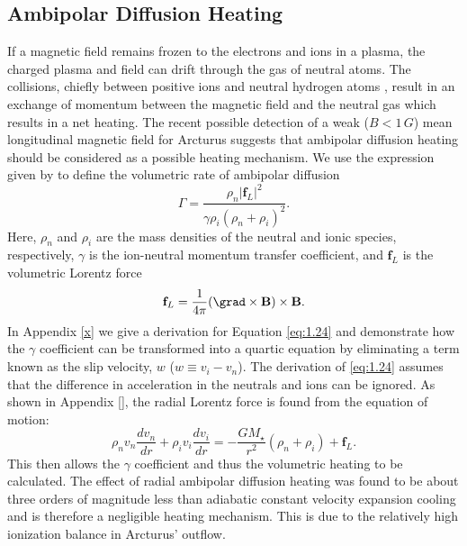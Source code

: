 \subsection{Ambipolar Diffusion Heating}\label{sec:7.4.2}
If a magnetic field remains frozen to the electrons and ions in a plasma, the charged plasma and field can drift through the gas of neutral atoms. The collisions, chiefly between positive ions and neutral hydrogen atoms \citep{spitzer_1978}, result in an exchange of momentum between the magnetic field and the neutral gas which results in a net heating. The recent possible detection of a weak ($B < 1\,G$) mean longitudinal magnetic field for Arcturus \citep{Sennhauser_2011} suggests that ambipolar diffusion heating should be considered as a possible heating mechanism.  We use the expression given by \cite{shang_2002} to define the volumetric rate of ambipolar  diffusion 
\begin{equation}\label{eq:1.24}
\Gamma = \frac{\rho _{n}|\mathbf{f}_{L}|^2}{\gamma \rho _{i}(\rho _{n}+\rho _{i})^2}.
\end{equation}
Here, $\rho _{n}$ and $\rho _{i}$ are the mass densities of the neutral and ionic species, respectively, $\gamma$ is the ion-neutral momentum transfer coefficient, and $\textbf{f}_{L}$ is the volumetric Lorentz force
\begin{equation}
\textbf{f}_{L}=\frac{1}{4\pi}(\grad \times \textbf{B})\times \textbf{B}.
\end{equation}
In Appendix \ref{x} we give a derivation for Equation \ref{eq:1.24} and demonstrate how the $\gamma$ coefficient can be transformed into a quartic equation by eliminating a term known as the slip velocity, $w$ ($w\equiv v_{i}-v_{n}$). The derivation of \ref{eq:1.24} assumes that the difference in acceleration in the neutrals and ions can be ignored. As shown in Appendix \ref{}, the radial Lorentz force is found from the equation of motion:
\begin{equation}
\rho _{n}v_{n}\frac{dv_{n}}{dr}+\rho _{i}v_{i}\frac{dv_{i}}{dr}=-\frac{GM_{\star}}{r^2}(\rho _{n} + \rho _{i})+\mathbf{f}_{L}.
\end{equation}
This then allows the $\gamma$ coefficient and thus the volumetric heating to be calculated. The effect of radial ambipolar diffusion heating was found to be about three orders of magnitude less than adiabatic constant velocity expansion cooling and is therefore a negligible heating mechanism. This is due to the relatively high ionization balance in Arcturus' outflow.

